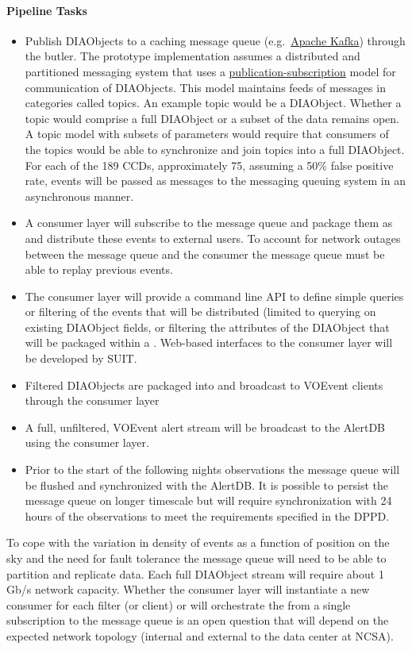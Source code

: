 \paragraph{Pipeline Tasks}
\begin{itemize}
\item Publish DIAObjects to a caching message queue (e.g.\ \hyperref[http://kafka.apache.org]{Apache Kafka}) through the butler. The prototype implementation assumes a distributed and partitioned messaging system that uses a \hyperref[https://en.wikipedia.org/wiki/Publish_subscribe_pattern]{publication-subscription} model for communication of DIAObjects. This model maintains feeds of messages in categories called topics. An example topic would be a DIAObject. Whether a topic would comprise a full DIAObject or a subset of the data remains open. A topic model with subsets of parameters would require that consumers of the topics would be able to synchronize and join topics into a full DIAObject. For each of the 189 CCDs, approximately 75, assuming a 50\% false positive rate, events will be passed as messages to the messaging queuing system in an asynchronous manner.
\item A consumer layer will subscribe to the  message queue and package them as \VOEvents and distribute these events to external users. To account for network outages between the message queue and the consumer the message queue must be able to replay previous events. 
\item  The consumer layer will provide a command line API to define simple queries or filtering of the events that will be distributed (limited to querying on existing DIAObject fields, or filtering the attributes of the DIAObject that will be packaged within a \VOEvent. Web-based interfaces to the consumer layer will be developed by SUIT. 
\item Filtered DIAObjects are packaged into \VOEvents and broadcast to VOEvent clients through the consumer layer
\item A full, unfiltered, VOEvent alert stream will be broadcast to the AlertDB using the consumer layer. 
\item Prior to the start of the following nights observations the message queue will be flushed and synchronized with the AlertDB. It is possible to persist the message queue on longer timescale but will require synchronization with 24 hours of the observations to meet the requirements specified in the DPPD.
\end{itemize}


To cope with the variation in density of events as a function of position on the sky and the need for fault tolerance the message queue will need to be able to partition and replicate data. Each full DIAObject stream will require about 1 Gb/s network capacity. Whether the consumer layer will instantiate a new consumer for each filter (or client) or will orchestrate the \VOEvents from a single subscription to the message queue is an open question that will depend on the expected network topology (internal and external to the data center at NCSA).

